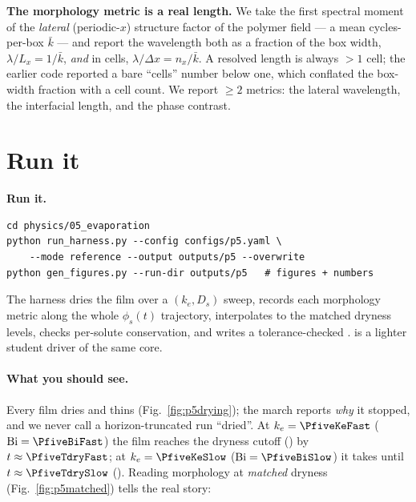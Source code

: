 \begin{keybox}
\textbf{The morphology metric is a real length.} We take the first
spectral moment of the \emph{lateral} (periodic-$x$) structure factor of
the polymer field --- a mean cycles-per-box $\bar k$ --- and report the
wavelength both as a fraction of the box width, $\lambda/L_x=1/\bar k$,
\emph{and} in cells, $\lambda/\Delta x = n_x/\bar k$. A resolved length is
always $>1$ cell; the earlier code reported a bare ``cells'' number below
one, which conflated the box-width fraction with a cell count. We report
$\ge 2$ metrics: the lateral wavelength, the interfacial length, and the
phase contrast.
\end{keybox}

\section{Run it}

\begin{runbox}
\textbf{Run it.}
\begin{lstlisting}
cd physics/05_evaporation
python run_harness.py --config configs/p5.yaml \
    --mode reference --output outputs/p5 --overwrite
python gen_figures.py --run-dir outputs/p5   # figures + numbers
\end{lstlisting}
The harness dries the film over a $(k_e, D_s)$ sweep, records each
morphology metric along the whole $\phi_s(t)$ trajectory, interpolates to
the matched dryness levels, checks per-solute conservation, and writes a
tolerance-checked \file{results.json}. \file{run.py} is a lighter
student driver of the same core.
\end{runbox}

\paragraph{What you should see.} Every film dries and thins
(Fig.~\ref{fig:p5drying}); the march reports \emph{why} it stopped, and we
never call a horizon-truncated run ``dried''. At $k_e=\PfiveKeFast$
($\mathrm{Bi}=\PfiveBiFast$) the film reaches the dryness cutoff
(\texttt{\PfiveReasonFast}) by $t\approx\PfiveTdryFast$; at
$k_e=\PfiveKeSlow$ ($\mathrm{Bi}=\PfiveBiSlow$) it takes until
$t\approx\PfiveTdrySlow$ (\texttt{\PfiveReasonSlow}). Reading morphology at
\emph{matched} dryness (Fig.~\ref{fig:p5matched}) tells the real story:

